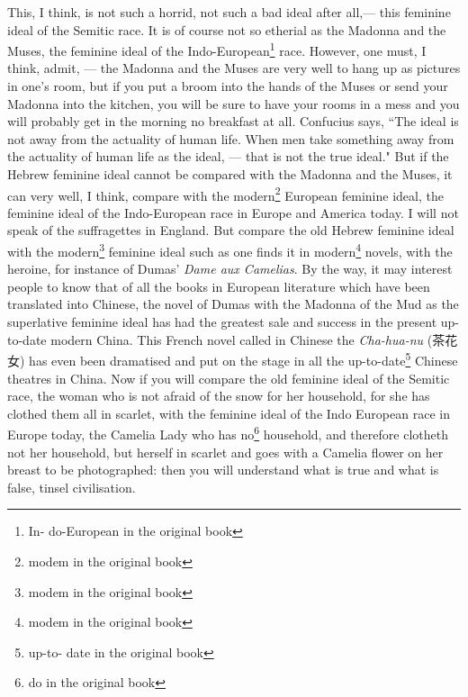 This, I think, is not such a horrid, not such a bad ideal after all,--- this feminine ideal  of the Semitic race.
It is of course not so etherial as the Madonna and the Muses, the feminine ideal of the Indo-European\footnote{In- do-European in the original book} race.
However, one must, I think, admit, --- the Madonna and the Muses are very well to hang up as pictures in one's room, but if you put a broom into the hands of the Muses or send your Madonna into the kitchen, you will be sure to have your rooms in a mess and you will probably get in the morning no breakfast at all.
Confucius says, ``The ideal is not away from the actuality of human life.
When men take something away from the actuality of human life as the ideal, --- that is not the true ideal."
But if the Hebrew feminine ideal cannot be compared with the Madonna and the Muses, it can very well, I think, compare with the modern\footnote{modem in the original book} European feminine ideal, the feminine ideal of the Indo-European race in Europe and America today.
I will not speak of the suffragettes in England.
But compare the old Hebrew feminine ideal with the modern\footnote{modem in the original book} feminine ideal such as one finds it in modern\footnote{modem in the original book} novels, with the heroine, for instance of Dumas'  \emph{Dame aux Camelias}. 
By the way, it may interest people to know that of all the books in European literature which have been translated into Chinese, the novel of Dumas with the Madonna of the Mud as the superlative feminine ideal has had the greatest sale and success in the present up-to-date modern China.
This French novel called in Chinese the \emph{Cha-hua-nu} (茶花女) has even been dramatised and put on the stage in all the up-to-date\footnote{up-to- date in the original book} Chinese theatres in China.
Now if you will compare the old feminine ideal of the Semitic race, the woman who is not afraid of the snow for her household, for she has clothed them all in scarlet, with the feminine ideal of the Indo European race in Europe today, the Camelia Lady who has no\footnote{do in the original book} household, and therefore clotheth not her household, but herself in scarlet and goes with a Camelia flower on her breast to be photographed: then you will understand what is true and what is false, tinsel civilisation.

